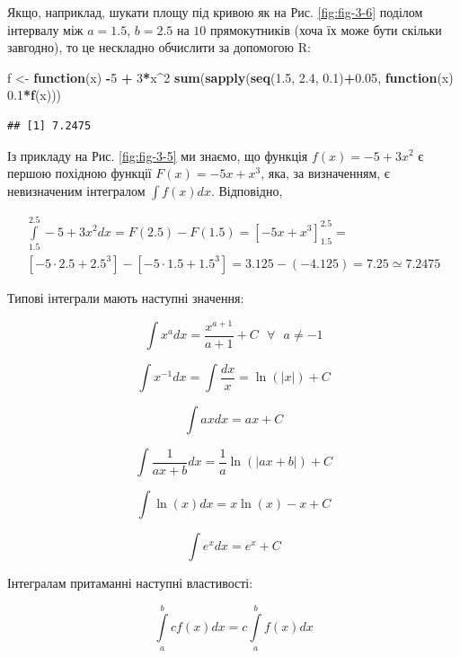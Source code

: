 \documentclass[
  11pt,
]{book}
\newenvironment{Shaded}{\begin{snugshade}}{\end{snugshade}}
\newcommand{\ControlFlowTok}[1]{\textcolor[rgb]{0.13,0.29,0.53}{\textbf{#1}}}
\newcommand{\DecValTok}[1]{\textcolor[rgb]{0.00,0.00,0.81}{#1}}
\newcommand{\FloatTok}[1]{\textcolor[rgb]{0.00,0.00,0.81}{#1}}
\newcommand{\FunctionTok}[1]{\textcolor[rgb]{0.13,0.29,0.53}{\textbf{#1}}}
\newcommand{\NormalTok}[1]{#1}
\newcommand{\OtherTok}[1]{\textcolor[rgb]{0.56,0.35,0.01}{#1}}
\newcommand{\SpecialCharTok}[1]{\textcolor[rgb]{0.81,0.36,0.00}{\textbf{#1}}}
\begin{document}
Якщо, наприклад, шукати площу під кривою як на Рис. \ref{fig:fig-3-6} поділом інтервалу між \(a = 1.5\), \(b = 2.5\) на \(10\) прямокутників (хоча їх може бути скільки завгодно), то це нескладно обчислити за допомогою R:

\begin{Shaded}
\begin{Highlighting}[]
\NormalTok{f }\OtherTok{\textless{}{-}} \ControlFlowTok{function}\NormalTok{(x) }\SpecialCharTok{{-}}\DecValTok{5} \SpecialCharTok{+} \DecValTok{3}\SpecialCharTok{*}\NormalTok{x}\SpecialCharTok{\^{}}\DecValTok{2}
\FunctionTok{sum}\NormalTok{(}\FunctionTok{sapply}\NormalTok{(}\FunctionTok{seq}\NormalTok{(}\FloatTok{1.5}\NormalTok{, }\FloatTok{2.4}\NormalTok{, }\FloatTok{0.1}\NormalTok{)}\SpecialCharTok{+}\FloatTok{0.05}\NormalTok{, }\ControlFlowTok{function}\NormalTok{(x) }\FloatTok{0.1}\SpecialCharTok{*}\FunctionTok{f}\NormalTok{(x)))}
\end{Highlighting}
\end{Shaded}

\begin{verbatim}
## [1] 7.2475
\end{verbatim}

Із прикладу на Рис. \ref{fig:fig-3-5} ми знаємо, що функція \(f(x) = -5 + 3x^2\) є першою похідною функції \(F(x) = -5x + x^3\), яка, за визначенням, є невизначеним інтегралом \(\int f(x)dx\). Відповідно,

\[
\begin{aligned}
  \int\limits_{1.5}^{2.5}-5 + 3x^2 dx = F(2.5) - F(1.5) = \left[ -5x + x^3 \right]_{1.5}^{2.5} = \\ [-5 \cdot 2.5 + 2.5^3] - [-5 \cdot 1.5 + 1.5^3] = 3.125 - (-4.125) = 7.25 \simeq 7.2475
\end{aligned}
\]

Типові інтеграли мають наступні значення:

\[\int x^a dx = \frac{x^{a+1}}{a+1} + C \text{ } \forall \text{ } a \neq -1\]

\[\int x^{-1} dx = \int \frac{dx}{x} = \ln(|x|) + C\]

\[\int axdx = ax + C\]

\[\int \frac{1}{ax + b}dx = \frac{1}{a} \ln(|ax+b|) + C\]

\[\int \ln(x) dx = x \ln(x) -x + C\]

\[\int e^x dx = e^x + C\]

Інтегралам притаманні наступні властивості:

\[\int \limits_a^b c f(x) dx = c \int \limits_a^b f(x) dx\]
\end{document}
